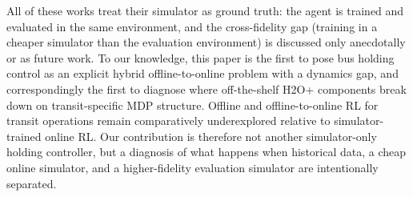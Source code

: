 All of these works treat their simulator as ground truth: the agent is trained and evaluated in the same environment, and the cross-fidelity gap (training in a cheaper simulator than the evaluation environment) is discussed only anecdotally or as future work.
To our knowledge, this paper is the first to pose bus holding control as an explicit hybrid offline-to-online problem with a dynamics gap, and correspondingly the first to diagnose where off-the-shelf H2O+ components break down on transit-specific MDP structure.
Offline and offline-to-online RL for transit operations remain comparatively underexplored relative to simulator-trained online RL.
Our contribution is therefore not another simulator-only holding controller, but a diagnosis of what happens when historical data, a cheap online simulator, and a higher-fidelity evaluation simulator are intentionally separated.
